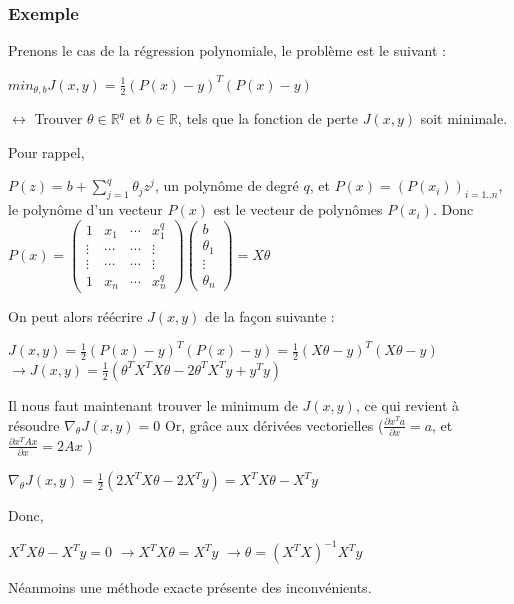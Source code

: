 \documentclass[a4paper, 11pt]{report}
\begin{document}
\subsubsection{Exemple}
Prenons le cas de la régression polynomiale, le problème est le suivant :
\begin{center}
	$min_{\theta,b} J(x,y) = \frac{1}{2} (P(x)-y)^T(P(x)-y)$
	
	$\leftrightarrow$ Trouver $\theta \in \mathbb{R}^q$ et $b \in \mathbb{R}$, tels que la fonction de perte $J(x,y)$ soit minimale.
\end{center}
Pour rappel, 
\begin{center}
	$P(z) = b + \sum_{j=1}^{q}{\theta_j z^j}$,
		un polynôme de degré $q$,
		et $P(x) = (P(x_i))_{i=1..n}$,
		le polynôme d'un vecteur $P(x)$ est le vecteur de polynômes $P(x_i)$.
		Donc $P(x) = 
	\begin{pmatrix}
		1      & x_1    & \cdots & x_1^q  \\
		\vdots & \cdots & \cdots & \vdots \\
		\vdots & \cdots & \cdots & \vdots \\
		1      & x_n    & \cdots & x_n^q  
	\end{pmatrix} 
	\begin{pmatrix}
		b        \\
		\theta_1 \\
		\vdots   \\
		\theta_n 
	\end{pmatrix}
	= X \theta
	$
\end{center}
On peut alors réécrire $J(x,y)$ de la façon suivante :
\begin{center}
	$J(x,y) = \frac{1}{2} (P(x)-y)^T(P(x)-y) = \frac{1}{2} (X\theta-y)^T(X\theta-y)$
		$\rightarrow J(x,y) =\frac{1}{2} (\theta^TX^TX\theta - 2\theta^TX^Ty + y^Ty)$
\end{center}
Il nous faut maintenant trouver le minimum de $J(x,y)$, ce qui revient à résoudre $\nabla_\theta J(x,y) = 0$
Or, grâce aux dérivées vectorielles ($\frac{\partial x^Ta}{\partial x} = a$, et $\frac{\partial x^TAx}{\partial x} = 2Ax$ )
\begin{center}
	$\nabla_\theta J(x,y) = \frac{1}{2} (2X^TX\theta-2X^Ty) = X^TX\theta-X^Ty$
\end{center}
Donc,
\begin{center}
	$X^TX\theta-X^Ty = 0$
		$\rightarrow X^TX\theta = X^Ty$
		$\rightarrow \theta = (X^TX)^{-1} X^Ty$
\end{center}
Néanmoins une méthode exacte présente des inconvénients.
\end{document}
